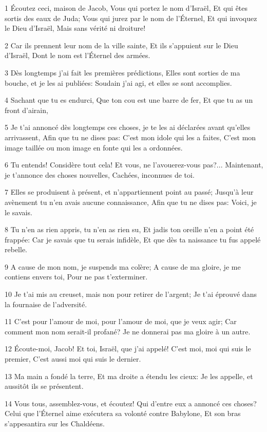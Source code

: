 \par 1 Écoutez ceci, maison de Jacob, Vous qui portez le nom d'Israël, Et qui êtes sortis des eaux de Juda; Vous qui jurez par le nom de l'Éternel, Et qui invoquez le Dieu d'Israël, Mais sans vérité ni droiture!
\par 2 Car ils prennent leur nom de la ville sainte, Et ils s'appuient sur le Dieu d'Israël, Dont le nom est l'Éternel des armées.
\par 3 Dès longtemps j'ai fait les premières prédictions, Elles sont sorties de ma bouche, et je les ai publiées: Soudain j'ai agi, et elles se sont accomplies.
\par 4 Sachant que tu es endurci, Que ton cou est une barre de fer, Et que tu as un front d'airain,
\par 5 Je t'ai annoncé dès longtemps ces choses, je te les ai déclarées avant qu'elles arrivassent, Afin que tu ne dises pas: C'est mon idole qui les a faites, C'est mon image taillée ou mon image en fonte qui les a ordonnées.
\par 6 Tu entends! Considère tout cela! Et vous, ne l'avouerez-vous pas?... Maintenant, je t'annonce des choses nouvelles, Cachées, inconnues de toi.
\par 7 Elles se produisent à présent, et n'appartiennent point au passé; Jusqu'à leur avènement tu n'en avais aucune connaissance, Afin que tu ne dises pas: Voici, je le savais.
\par 8 Tu n'en as rien appris, tu n'en as rien su, Et jadis ton oreille n'en a point été frappée: Car je savais que tu serais infidèle, Et que dès ta naissance tu fus appelé rebelle.
\par 9 A cause de mon nom, je suspends ma colère; A cause de ma gloire, je me contiens envers toi, Pour ne pas t'exterminer.
\par 10 Je t'ai mis au creuset, mais non pour retirer de l'argent; Je t'ai éprouvé dans la fournaise de l'adversité.
\par 11 C'est pour l'amour de moi, pour l'amour de moi, que je veux agir; Car comment mon nom serait-il profané? Je ne donnerai pas ma gloire à un autre.
\par 12 Écoute-moi, Jacob! Et toi, Israël, que j'ai appelé! C'est moi, moi qui suis le premier, C'est aussi moi qui suis le dernier.
\par 13 Ma main a fondé la terre, Et ma droite a étendu les cieux: Je les appelle, et aussitôt ils se présentent.
\par 14 Vous tous, assemblez-vous, et écoutez! Qui d'entre eux a annoncé ces choses? Celui que l'Éternel aime exécutera sa volonté contre Babylone, Et son bras s'appesantira sur les Chaldéens.
